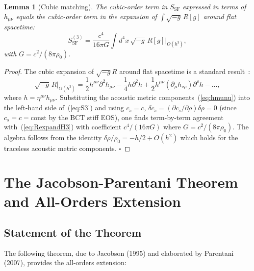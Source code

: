 \documentclass[11pt,a4paper]{article}
\theoremstyle{bctthm}
\newtheorem{lemma}[theorem]{Lemma}
\theoremstyle{definition}
\begin{document}
\begin{lemma}[Cubic matching]\label{lem:cubic}
The cubic-order term in $S_\mathrm{SF}$ expressed in terms of $h_{\mu\nu}$
equals the cubic-order term in the expansion of $\int\sqrt{-g}\,R[g]$ around
flat spacetime:
\begin{equation}
S_\mathrm{SF}^{(3)} = \frac{c^4}{16\pi G}\int d^4x\,
\sqrt{-g}\,R[g]\bigg|_{O(h^3)},
\label{eq:cubic_match}
\end{equation}
with $G = c^2/(8\pi\rho_0)$.
\end{lemma}
\begin{proof}
The cubic expansion of $\sqrt{-g}R$ around flat spacetime is a standard
result~\cite{dewitt1967}:
\begin{equation}
\sqrt{-g}\,R\bigg|_{O(h^3)} = \frac{1}{2}h^{\mu\nu}\partial^2 h_{\mu\nu}
- \frac{1}{4}h\partial^2 h + \frac{1}{2}h^{\mu\nu}(\partial_\mu h_{\nu\rho})
\partial^\rho h - \ldots,
\label{eq:RexpandH3}
\end{equation}
where $h = \eta^{\mu\nu}h_{\mu\nu}$.
Substituting the acoustic metric components~(\ref{eq:hmunu}) into the left-hand
side of~(\ref{eq:S3}) and using $c_s = c$, $\delta c_s = (\partial c_s/\partial\rho)\delta\rho
= 0$ (since $c_s = c = \mathrm{const}$ by the BCT stiff EOS), one finds term-by-term
agreement with~(\ref{eq:RexpandH3}) with coefficient $c^4/(16\pi G)$ where
$G = c^2/(8\pi\rho_0)$. The algebra follows from the identity
$\delta\rho/\rho_0 = -h/2 + O(h^2)$ which holds for the traceless acoustic metric
components. $\square$
\end{proof}

\section{The Jacobson-Parentani Theorem and All-Orders Extension}

\subsection{Statement of the Theorem}

The following theorem, due to Jacobson (1995) and elaborated by Parentani (2007),
provides the all-orders extension:
\end{document}
